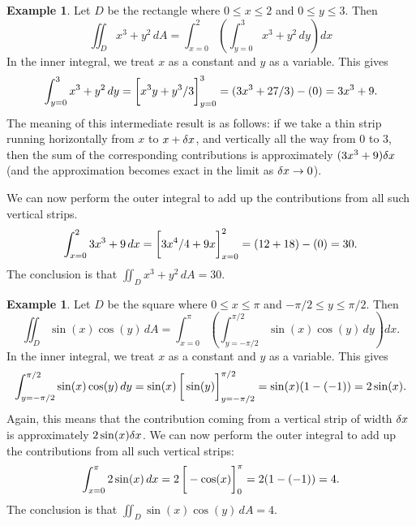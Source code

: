 \documentclass[reqno]{amsart}
\theoremstyle{definition}
\newtheorem{example}[theorem]{Example}
\begin{document}
\begin{example}\label{eg-rectangle}
 Let $D$ be the rectangle where $0\leq x\leq 2$ and $0\leq y\leq 3$.
 Then 
 \[ \iint_D x^3+y^2\,dA =
     \int_{x=0}^2 \left(\int_{y=0}^3 x^3+y^2 \,dy\right) dx
 \]
 In the inner integral, we treat $x$ as a constant and $y$ as a
 variable.  This gives
 \[ \int_{y=0}^3 x^3+y^2\,dy =
     \CH{x^3y + y^3/3}_{y=0}^3 =
      (3x^3+27/3)-(0) = 3x^3+9.
 \] 
 The meaning of this intermediate result is as follows: if we take a
 thin strip running horizontally from $x$ to $x+\delta x$, and vertically
 all the way from $0$ to $3$, then the sum of the corresponding
 contributions is approximately $(3x^3+9)\delta x$ (and the approximation
 becomes exact in the limit as $\delta x\to 0$).  
 \begin{center}
 \end{center}
 We can now perform the outer integral to add up the contributions
 from all such vertical strips.
 \[ \int_{x=0}^2 3x^3 + 9 \, dx = 
     \CH{3x^4/4 + 9x}_{x=0}^2 = 
      (12 + 18) - (0) = 30.
 \]
 The conclusion is that $\iint_D x^3+y^2\,dA=30$.
\end{example}
\begin{example}
 Let $D$ be the square where $0\leq x\leq\pi$ and
 $-\pi/2\leq y\leq\pi/2$.  Then  
 \[ \iint_D \sin(x)\cos(y)\,dA = 
     \int_{x=0}^\pi\left(
      \int_{y=-\pi/2}^{\pi/2} \sin(x)\cos(y)\,dy
       \right) dx.
 \]
 In the inner integral, we treat $x$ as a constant and $y$ as a
 variable.  This gives
 \[ \int_{y=-\pi/2}^{\pi/2} \sin(x)\cos(y)\,dy = 
     \sin(x) \CH{\sin(y)}_{y=-\pi/2}^{\pi/2} =
      \sin(x)(1-(-1)) = 2\sin(x). 
 \]
 Again, this means that the contribution coming from a vertical strip
 of width $\delta x$ is approximately $2\sin(x)\delta x$.  We can now
 perform the outer integral to add up the contributions from all such
 vertical strips:
 \[ \int_{x=0}^{\pi} 2\sin(x)\,dx = 
     2\CH{-\cos(x)}_0^{\pi} = 
      2(1-(-1)) = 4.
 \]
 The conclusion is that $\iint_D \sin(x)\cos(y)\,dA=4$.  
\end{example}
\end{document}
